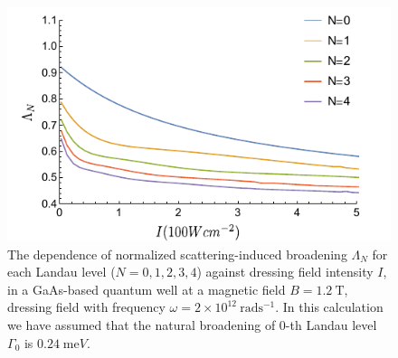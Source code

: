 \begin{figure}[t]
\includegraphics[scale=1]{figures/fig_4}
\caption{\label{fig_4} The dependence of normalized scattering-induced broadening $\Lambda_N$ for each Landau level ($N =0,1,2,3,4$) against dressing field intensity $I$, in a GaAs-based quantum well at a magnetic field $B = 1.2~\text{T}$, dressing field with frequency $\omega =2\times10^{12}~\text{rad}\text{s}^{-1}$. In this calculation we have assumed that the natural broadening of $0$-th Landau level $\Gamma_0$ is $0.24\;\text{me}V$.}
\end{figure}
